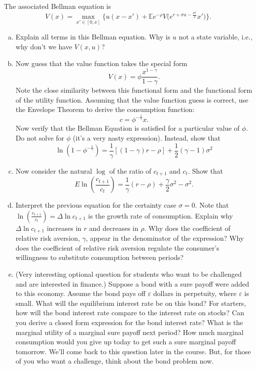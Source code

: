 \documentclass[11pt]{extarticle}
\theoremstyle{plain}
\theoremstyle{definition}
\begin{document}
The associated Bellman equation is 
\begin{equation*}
	V(x) = \max_{x' \in [0, x]} \bigg\{ u(x - x') + \mathbb E e^{- \rho} V \bigg( e^{r + \sigma u - \frac{\sigma^2}{2}} x' \bigg) \bigg\}.
\end{equation*}

\begin{enumerate}[(a)]
\item Explain all terms in this Bellman equation. Why is $u$ not a state variable, i.e., why don't we have $V(x, u)$?


\item Now guess that the value function takes the special form
$$
V(x)=\phi \frac{x^{1-\gamma}}{1-\gamma} .
$$
Note the close similarity between this functional form and the functional form of the utility function. Assuming that the value function guess is correct, use the Envelope Theorem to derive the consumption function:
$$
c=\phi^{-\frac{1}{\gamma}} x .
$$
Now verify that the Bellman Equation is satisfied for a particular value of $\phi$. Do not solve for $\phi$ (it's a very nasty expression). Instead, show that
$$
\ln \left(1-\phi^{-\frac{1}{\gamma}}\right)=\frac{1}{\gamma}[(1-\gamma) r-\rho]+\frac{1}{2}(\gamma-1) \sigma^2
$$


\item Now consider the natural $\log$ of the ratio of $c_{t+1}$ and $c_t$. Show that
$$
E \ln \left(\frac{c_{t+1}}{c_t}\right)=\frac{1}{\gamma}(r-\rho)+\frac{\gamma}{2} \sigma^2-\sigma^2 .
$$
\item Interpret the previous equation for the certainty case $\sigma=0$. Note that $\ln \left(\frac{c_{t+1}}{c_t}\right)=\Delta \ln c_{t+1}$ is the growth rate of consumption. Explain why $\Delta \ln c_{t+1}$ increases in $r$ and decreases in $\rho$. Why does the coefficient of relative risk aversion, $\gamma$, appear in the denominator of the expression? Why does the coefficient of relative risk aversion regulate the consumer's willingness to substitute consumption between periods?
\item (Very interesting optional question for students who want to be challenged and are interested in finance.) Suppose a bond with a sure payoff were added to this economy. Assume the bond pays off $\varepsilon$ dollars in perpetuity, where $\varepsilon$ is small. What will the equilibrium interest rate be on this bond? For starters, how will the bond interest rate compare to the interest rate on stocks? Can you derive a closed form expression for the bond interest rate? What is the marginal utility of a marginal sure payoff next period? How much marginal consumption would you give up today to get such a sure marginal payoff tomorrow. We'll come back to this question later in the course. But, for those of you who want a challenge, think about the bond problem now.

\end{enumerate}
\end{document}
